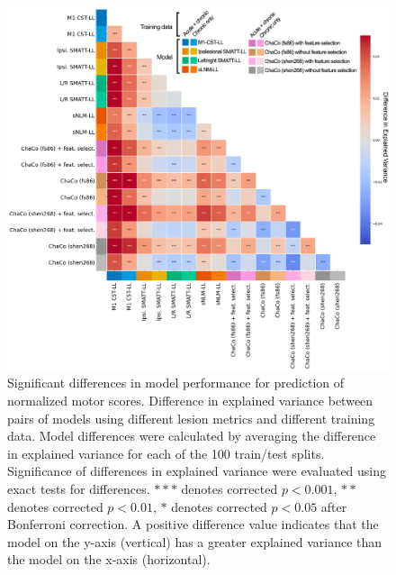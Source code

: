 \documentclass[10pt]{article}
\begin{document}
\begin{figure}[hp]
\centering
\includegraphics[width=1\linewidth]{figures/analysis_1_matrix_figure_colors.png}
\caption{Significant differences in model performance for prediction of normalized motor scores. Difference in explained variance between pairs of models using different lesion metrics and different training data. Model differences were calculated by averaging the difference in explained variance for each of the 100 train/test splits. Significance of differences in explained variance were evaluated using exact tests for differences. $***$ denotes corrected $p < 0.001$, $**$ denotes corrected $p < 0.01$, $*$ denotes corrected $p < 0.05$ after Bonferroni correction. A positive difference value indicates that the model on the y-axis (vertical) has a greater explained variance than the model on the x-axis (horizontal).
 }
\label{analysis1}
\end{figure}
\end{document}
